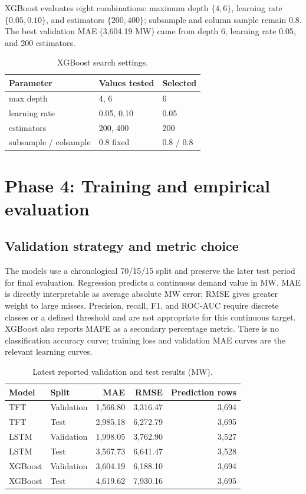 \documentclass[11pt,a4paper]{article}
\begin{document}
XGBoost evaluates eight combinations: maximum depth $\{4,6\}$, learning rate $\{0.05,0.10\}$, and estimators $\{200,400\}$; subsample and column sample remain 0.8. The best validation MAE (3,604.19 MW) came from depth 6, learning rate 0.05, and 200 estimators.
\begin{table}[H]\centering\small\caption{XGBoost search settings.}\begin{tabular}{lll}\toprule Parameter & Values tested & Selected \\\midrule max depth & 4, 6 & 6 \\ learning rate & 0.05, 0.10 & 0.05 \\ estimators & 200, 400 & 200 \\ subsample / colsample & 0.8 fixed & 0.8 / 0.8 \\\bottomrule\end{tabular}\end{table}

\section{Phase 4: Training and empirical evaluation}
\subsection{Validation strategy and metric choice}
The models use a chronological 70/15/15 split and preserve the later test period for final evaluation. Regression predicts a continuous demand value in MW. MAE is directly interpretable as average absolute MW error; RMSE gives greater weight to large misses. Precision, recall, F1, and ROC-AUC require discrete classes or a defined threshold and are not appropriate for this continuous target. XGBoost also reports MAPE as a secondary percentage metric. There is no classification accuracy curve; training loss and validation MAE curves are the relevant learning curves.

\begin{table}[H]\centering\caption{Latest reported validation and test results (MW).}\begin{tabular}{llrrr}\toprule Model & Split & MAE & RMSE & Prediction rows \\\midrule TFT & Validation & 1,566.80 & 3,316.47 & 3,694 \\ TFT & Test & 2,985.18 & 6,272.79 & 3,695 \\ LSTM & Validation & 1,998.05 & 3,762.90 & 3,527 \\ LSTM & Test & 3,567.73 & 6,641.47 & 3,528 \\ XGBoost & Validation & 3,604.19 & 6,188.10 & 3,694 \\ XGBoost & Test & 4,619.62 & 7,930.16 & 3,695 \\\bottomrule\end{tabular}\end{table}
\end{document}
